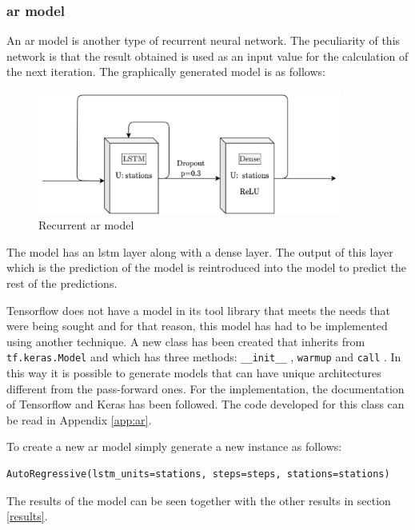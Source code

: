 \subsubsection{\acrfull{ar} model}\label{model_ar}


An \acrshort{ar} model is another type of recurrent neural network. The peculiarity of this network is that the result obtained is used as an input value for the calculation of the next iteration. The graphically generated model is as follows:

\begin{figure}[H]
    \centering
    \includegraphics[width=10cm]{images/solution/models/AR.png}
    \caption{Recurrent \acrshort{ar} model}
    \label{fig:dense-model}
\end{figure}

The model has an \acrshort{lstm} layer along with a dense layer. The output of this layer which is the prediction of the model is reintroduced into the model to predict the rest of the predictions.
\newline

Tensorflow does not have a model in its tool library that meets the needs that were being sought and for that reason, this model has had to be implemented using another technique. A new class has been created that inherits from \small{\verb|tf.keras.Model|} \normalsize  and which has three methods: \small{\verb|__init__|} \normalsize , \small{\verb|warmup|} \normalsize  and \small{\verb|call|} \normalsize . In this way it is possible to generate models that can have unique architectures different from the pass-forward ones. For the implementation, the documentation of Tensorflow \cite{tensorflow2015-whitepaper} and Keras \cite{keras} has been followed. The code developed for this class can be read in Appendix \ref{app:ar}.
\newline

To create a new \acrshort{ar} model simply generate a new instance as follows:

\begin{verbatim}
AutoRegressive(lstm_units=stations, steps=steps, stations=stations)
\end{verbatim}

The results of the model can be seen together with the other results in section \ref{results}.